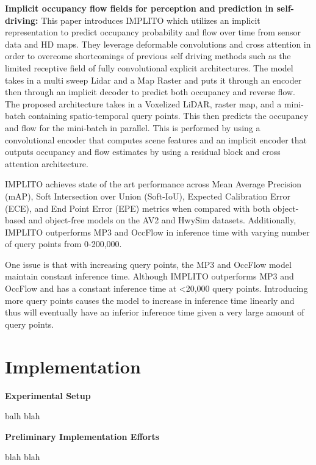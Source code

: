 \documentclass{article}
\theoremstyle{plain}
\theoremstyle{definition}
\theoremstyle{remark}
\begin{document}
\textbf{Implicit occupancy flow fields for perception and prediction in self-driving: }
This paper introduces IMPLITO which utilizes an implicit representation to predict occupancy probability and flow over time from sensor data and HD maps. They leverage deformable convolutions and cross attention in order to overcome shortcomings of previous self driving methods such as the limited receptive field of fully convolutional explicit architectures. The model takes in a multi sweep Lidar and a Map Raster and puts it through an encoder then through an implicit decoder to predict both occupancy and reverse flow.
The proposed architecture takes in a Voxelized LiDAR, raster map, and a mini-batch containing spatio-temporal query points. This then predicts the occupancy and flow for the mini-batch in parallel. This is performed by using a convolutional encoder that computes scene features and an implicit encoder that outputs occupancy and flow estimates by using a residual block and cross attention architecture. 

\hspace{20pt} IMPLITO achieves state of the art performance across Mean Average Precision (mAP), Soft Intersection over Union (Soft-IoU), Expected Calibration Error (ECE), and End Point Error (EPE) metrics when compared with both object-based and object-free models on the AV2 and HwySim datasets. Additionally, IMPLITO outperforms MP3 and OccFlow in inference time with varying number of query points from 0-200,000.

\hspace{20pt} One issue is that with increasing query points, the MP3 and OccFlow model maintain constant inference time. Although IMPLITO outperforms MP3 and OccFlow and has a constant inference time at <20,000 query points. Introducing more query points causes the model to increase in inference time linearly and thus will eventually have an inferior inference time given a very large amount of query points.

\section*{Implementation}
\textbf{Experimental Setup}

balh blah

\textbf{Preliminary Implementation Efforts}

blah blah
\end{document}
